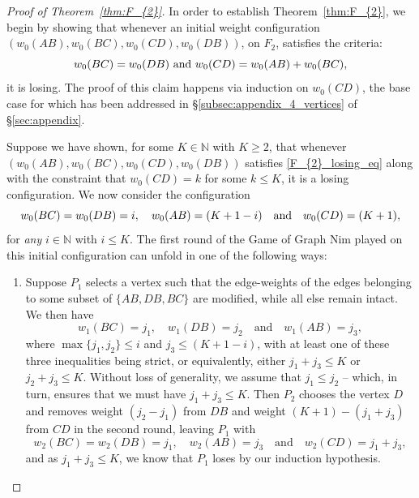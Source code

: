 \documentclass[11pt,reqno]{amsart}
\theoremstyle{definition}
\theoremstyle{definition}
\begin{document}
\begin{proof}[Proof of Theorem~\ref{thm:F_{2}}]
In order to establish Theorem~\ref{thm:F_{2}}, we begin by showing that whenever an initial weight configuration $\left(w_{0}(AB),w_{0}(BC),w_{0}(CD),w_{0}(DB)\right)$, on $F_{2}$, satisfies the criteria:
\begin{equation}
w_{0}(BC)=w_{0}(DB) \text{ and } w_{0}(CD)=w_{0}(AB)+w_{0}(BC),\label{F_{2}_losing_eq}
\end{equation}
it is losing. The proof of this claim happens via induction on $w_{0}(CD)$, the base case for which has been addressed in \S\ref{subsec:appendix_4_vertices} of \S\ref{sec:appendix}.

Suppose we have shown, for some $K \in \mathbb{N}$ with $K \geqslant 2$, that whenever $\left(w_{0}(AB),w_{0}(BC),w_{0}(CD),w_{0}(DB)\right)$ satisfies \eqref{F_{2}_losing_eq} along with the constraint that $w_{0}(CD)=k$ for some $k \leqslant K$, it is a losing configuration. We now consider the configuration
\begin{equation}
w_{0}(BC)=w_{0}(DB)=i, \quad w_{0}(AB)=(K+1-i) \quad \text{and} \quad w_{0}(CD)=(K+1),\label{F_{2}_losing_eq_inductive}
\end{equation}
for \emph{any} $i \in \mathbb{N}$ with $i \leqslant K$. The first round of the Game of Graph Nim played on this initial configuration can unfold in one of the following ways:
\begin{enumerate}
\item Suppose $P_{1}$ selects a vertex such that the edge-weights of the edges belonging to some subset of $\{AB, DB, BC\}$ are modified, while all else remain intact. We then have 
\begin{equation}
w_{1}(BC)=j_{1}, \quad w_{1}(DB)=j_{2} \quad \text{and} \quad w_{1}(AB)=j_{3},\nonumber
\end{equation}
where $\max\{j_{1},j_{2}\} \leqslant i$ and $j_{3} \leqslant (K+1-i)$, with at least one of these three inequalities being strict, or equivalently, either $j_{1}+j_{3} \leqslant K$ or $j_{2}+j_{3} \leqslant K$. Without loss of generality, we assume that $j_{1} \leqslant j_{2}$ -- which, in turn, ensures that we must have $j_{1}+j_{3} \leqslant K$. Then $P_{2}$ chooses the vertex $D$ and removes weight $(j_{2}-j_{1})$ from $DB$ and weight $(K+1)-(j_{1}+j_{3})$ from $CD$ in the second round, leaving $P_{1}$ with
\begin{equation}
w_{2}(BC)=w_{2}(DB)=j_{1}, \quad w_{2}(AB)=j_{3} \quad \text{and} \quad w_{2}(CD)=j_{1}+j_{3},\nonumber
\end{equation}
and as $j_{1}+j_{3} \leqslant K$, we know that $P_{1}$ loses by our induction hypothesis.


\end{enumerate}
\end{proof}
\end{document}
